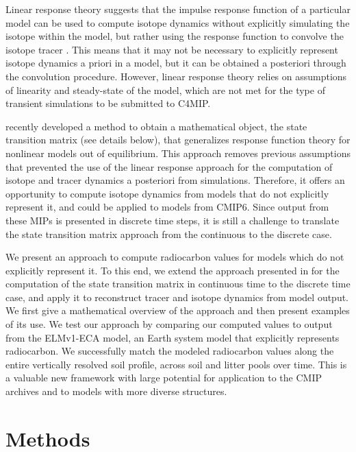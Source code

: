\documentclass[11pt,a4paper]{article}
\begin{document}
Linear response theory suggests that the impulse response function of a particular model can be used to compute isotope dynamics without explicitly simulating the isotope within the model, but rather using the response function to convolve the isotope tracer \citep{Thompson1999}. This means that it may not be necessary to explicitly represent isotope dynamics a priori in a model, but it can be obtained a posteriori through the convolution procedure. However, linear response theory relies on assumptions of linearity and steady-state of the model, which are not met for the type of transient simulations to be submitted to C4MIP. 

\citet{Metzler2018PNAS} recently developed a method to obtain a mathematical object, the state transition matrix (see details below), that generalizes response function theory for nonlinear models out of equilibrium. This approach removes previous assumptions that prevented the use of the linear response approach for the computation of isotope and tracer dynamics a posteriori from simulations. Therefore, it offers an opportunity to compute isotope dynamics from models that do not explicitly represent it, and could be applied to models from CMIP6. Since output from these MIPs is presented in discrete time steps, it is still a challenge to translate the state transition matrix approach from the continuous to the discrete case.

We present an approach to compute radiocarbon values for models which do not explicitly represent it. To this end, we extend the approach presented in \citet{Metzler2018PNAS} for the computation of the state transition matrix in continuous time to the discrete time case, and apply it to reconstruct tracer and isotope dynamics from model output. We first give a mathematical overview of the approach and then present examples of its use. We test our approach by comparing our computed values to output from the ELMv1-ECA model, an Earth system model that explicitly represents radiocarbon. We successfully match the modeled radiocarbon values along the entire vertically resolved soil profile, across soil and litter pools over time. This is a valuable new framework with large potential for application to the CMIP archives and to models with more diverse structures. 

\section{Methods}
\end{document}
